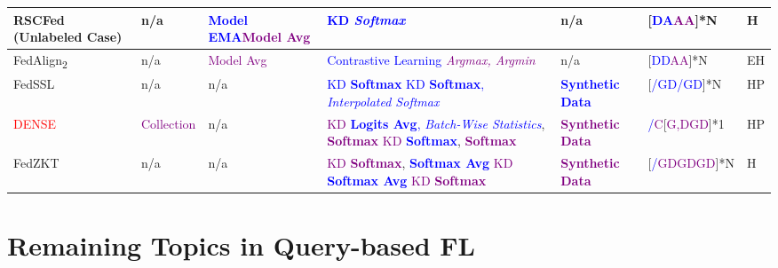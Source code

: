 \begin{table}[htp]
\begin{tabular}{|p{2.05cm}|p{1.36cm}|p{1.56cm}|p{4.35cm}|p{2.77cm}|p{1.5cm}|p{0.35cm}|}
    \rowcolor[gray]{.9}
    RSCFed~\cite{liang2022rscfed} \newline (Unlabeled Case) & n/a & \textcolor{blue}{Model EMA}\newline \textcolor{purple}{Model Avg} &\textcolor{blue}{KD} \textcolor{blue}{\textit{Softmax}} & n/a & [\textcolor{blue}{DA}\textcolor{purple}{AA}]*N & H \\ \hline

    FedAlign\textsubscript{2}~\cite{zhang2023navigating} & n/a &\textcolor{purple}{Model Avg}&\textcolor{blue}{Contrastive Learning}  \textcolor{purple}{\textit{Argmax, Argmin}} & n/a & [\textcolor{blue}{DD}\textcolor{purple}{AA}]*N & EH \\ \hline

    \rowcolor[gray]{.9}
    FedSSL~\cite{fan2022private} & n/a & n/a & \textcolor{blue}{KD} \textcolor{blue}{\textbf{Softmax}} \newline \textcolor{blue}{KD} \textcolor{blue}{\textbf{Softmax}, \textit{Interpolated Softmax}} & \textcolor{blue}{\textbf{Synthetic Data}} & [\textcolor{blue}{/GD/GD}]*N & HP \\ \hline
    \textcolor{red}{DENSE}~\cite{zhang2022dense} & \textcolor{purple}{Collection} & n/a & \textcolor{purple}{KD} \textcolor{blue}{\textbf{Logits Avg}, \textit{Batch-Wise Statistics}}, \textcolor{purple}{\textbf{Softmax}} \textcolor{purple}{KD} \textcolor{blue}{\textbf{Softmax}}, \textcolor{purple}{\textbf{Softmax}} & \textcolor{purple}{\textbf{Synthetic Data}} & \textcolor{blue}{/}\textcolor{purple}{C}[\textcolor{purple}{G,DGD}]*1 & HP \\ \hline %

    \rowcolor[gray]{.9}
    FedZKT~\cite{zhang2022fedzkt} & n/a & n/a &\textcolor{purple}{KD} \textcolor{purple}{\textbf{Softmax}}, \textcolor{blue}{\textbf{Softmax Avg}} \newline \textcolor{purple}{KD} \textcolor{blue}{\textbf{Softmax Avg}} \textcolor{purple}{KD} \textcolor{purple}{\textbf{Softmax}} & \textcolor{purple}{\textbf{Synthetic Data}} & [\textcolor{blue}{/}\textcolor{purple}{GDGDGD}]*N & H \\ \hline

  \end{tabular}
\end{table}


\section{Remaining Topics in Query-based FL}
\label{sec:remaining_qbfl}
